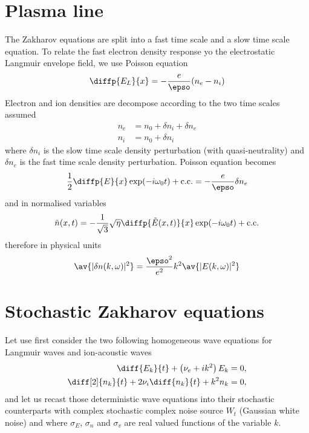 \documentclass[10pt,a4paper]{article}
\begin{document}
\section{Plasma line}
The Zakharov equations are split into a fast time scale and a slow time
scale equation. To relate the fast electron density response yo the
electrostatic Langmuir envelope field, we use Poisson equation
\begin{align}
\diffp{E_L}{x}=-\frac{e}{\epso}(n_e-n_i)
\end{align}
Electron and ion densities are decompose according to the two time scales
assumed
\begin{align}
n_e & = n_0+\delta n_i + \delta n_e\\
n_i & = n_0+\delta n_i
\end{align}
where $\delta n_i$ is the slow time scale density perturbation (with
quasi-neutrality) and $\delta n_e$ is the fast time scale density
perturbation.
Poisson equation becomes
\begin{align}
\frac{1}{2}\diffp{E}{x}\exp(-i\omega_0t)+\text{c.c.}=
-\frac{e}{\epso}\delta n_e
\end{align}
and in normalised variables
\begin{align}
\tilde{n}(x,t) =
-\frac{1}{\sqrt{3}}\sqrt{\eta}\diffp{\tilde{E}(x,t)}{x}\exp(-i\omega_0t)+
\text{c.c.}
\end{align}
therefore in physical units
\begin{align}
\av{|\delta n(k, \omega)|^2} = \frac{\epso^2}{e^2} k^2\av{|E(k,\omega)|^2}
\end{align}

\section{Stochastic Zakharov equations}
Let use first consider the two following homogeneous wave equations 
for Langmuir waves and ion-acoustic waves
\begin{align}
\diff{E_k}{t}+\left(\nu_e+ik^2\right)E_k &= 0,
\label{eq:lwe}\\
\diff[2]{n_k}{t}+2\nu_i\diff{n_k}{t}+k^2n_k &= 0,
\label{eq:lwn}
\end{align}
and let us recast those deterministic wave equations into their stochastic
counterparts
with complex stochastic complex noise source $W_t$ (Gaussian white noise)
and where $\sigma_E$, $\sigma_n$ and $\sigma_v$ are real valued functions
of the variable $k$. 
\end{document}
